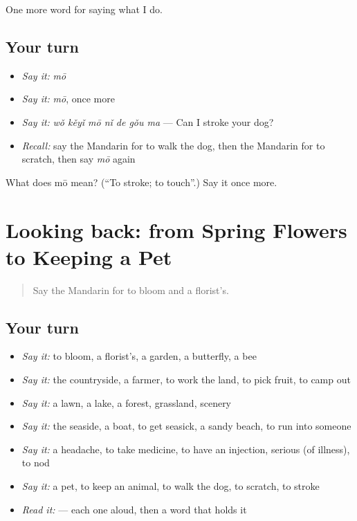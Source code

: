 \begin{grammarlens}[title={What you've built}]
One more word for saying what I do.
\end{grammarlens}

\subsection*{Your turn}
\begin{itemize}
\raggedright
  \item \emph{Say it:} \emph{mō}
  \item \emph{Say it:} \emph{mō}, once more
  \item \emph{Say it:} \emph{wǒ kěyǐ mō nǐ de gǒu ma} — Can I stroke your dog?
  \item \emph{Recall:} say the Mandarin for to walk the dog, then the Mandarin for to scratch, then say \emph{mō} again
\end{itemize}

\begin{tcolorbox}[breakable,colback=teal!4,colframe=teal!35!black,title={Before you move on}]
What does mō mean? (\textquotedblleft{}To stroke; to touch\textquotedblright{}.) Say it once more.
\end{tcolorbox}
\section[(dialogue)]{Looking back: from Spring Flowers to Keeping a Pet}

\label{lesson:ZH-R229-review-224-229}



\begin{quote}
Say the Mandarin for to bloom and a florist's.
\end{quote}

\subsection*{Your turn}
\begin{itemize}
\raggedright
  \item \emph{Say it:} to bloom, a florist's, a garden, a butterfly, a bee
  \item \emph{Say it:} the countryside, a farmer, to work the land, to pick fruit, to camp out
  \item \emph{Say it:} a lawn, a lake, a forest, grassland, scenery
  \item \emph{Say it:} the seaside, a boat, to get seasick, a sandy beach, to run into someone
  \item \emph{Say it:} a headache, to take medicine, to have an injection, serious (of illness), to nod
  \item \emph{Say it:} a pet, to keep an animal, to walk the dog, to scratch, to stroke
  \item \emph{Read it:}     — each one aloud, then a word that holds it
\end{itemize}

